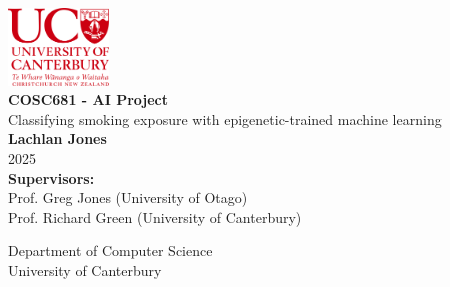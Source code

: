 \documentclass{article}
\begin{document}
\doublespacing



\begin{titlepage}
    \centering
    \singlespacing
    \vspace*{1cm}

    \includegraphics[width=0.2\textwidth]{University_of_Canterbury_logo.svg.png}\\[1.5cm]

    \Huge
    \textbf{COSC681 - AI Project}\\[1.5cm]

    \LARGE
    Classifying smoking exposure with epigenetic-trained machine learning\\[2cm]

    \Large
    \textbf{Lachlan Jones}\\[0.5cm]
    2025\\[1cm]

    \large
    \textbf{Supervisors:}\\
    Prof. Greg Jones (University of Otago)\\
    Prof. Richard Green (University of Canterbury)

    \vfill

    \Large
    Department of Computer Science\\
    University of Canterbury
\end{titlepage}


\begin{abstract}

\end{abstract}

\newpage
\tableofcontents
\end{document}
